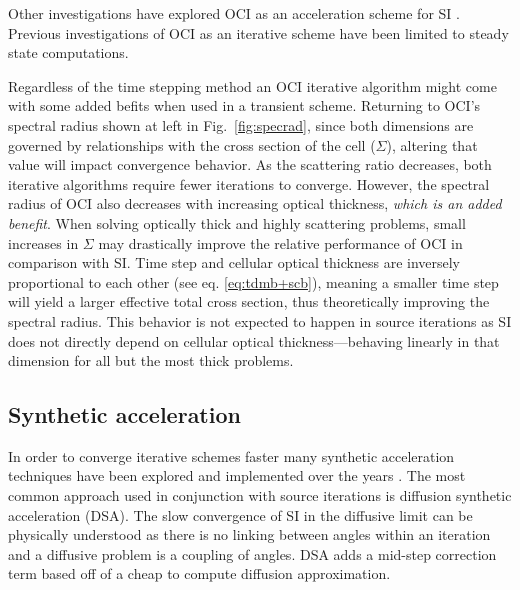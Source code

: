 Other investigations have explored OCI as an acceleration scheme for SI \cite{anistratov_iterative_2015, hoagland_hybrid_2021}. %
Previous investigations of OCI as an iterative scheme have been limited to steady state computations.

Regardless of the time stepping method an OCI iterative algorithm might come with some added befits when used in a transient scheme.
Returning to OCI's spectral radius shown at left in Fig.~\ref{fig:specrad}, since both dimensions are governed by relationships with the cross section of the cell ($\Sigma$), altering that value will impact convergence behavior. 
As the scattering ratio decreases, both iterative algorithms require fewer iterations to converge.
However, the spectral radius of OCI also decreases with increasing optical thickness, \textit{which is an added benefit}.
When solving optically thick and highly scattering problems, small increases in $\Sigma$ may drastically improve the relative performance of OCI in comparison with SI.
Time step and cellular optical thickness are inversely proportional to each other (see eq. \ref{eq:tdmb+scb}), meaning a smaller time step will yield a larger effective total cross section, thus theoretically improving the spectral radius.
This behavior is not expected to happen in source iterations as SI does not directly depend on cellular optical thickness---behaving linearly in that dimension for all but the most thick problems.

\subsection{Synthetic acceleration}
\label{sec:syn_acc}
In order to converge iterative schemes faster many synthetic acceleration techniques have been explored and implemented over the years \cite{adams_fast_2002}.
The most common approach used in conjunction with source iterations is diffusion synthetic acceleration (DSA)\cite{adams_fast_2002}.
The slow convergence of SI in the diffusive limit can be physically understood as there is no linking between angles within an iteration and a diffusive problem is a coupling of angles.
DSA adds a mid-step correction term based off of a cheap to compute diffusion approximation.

